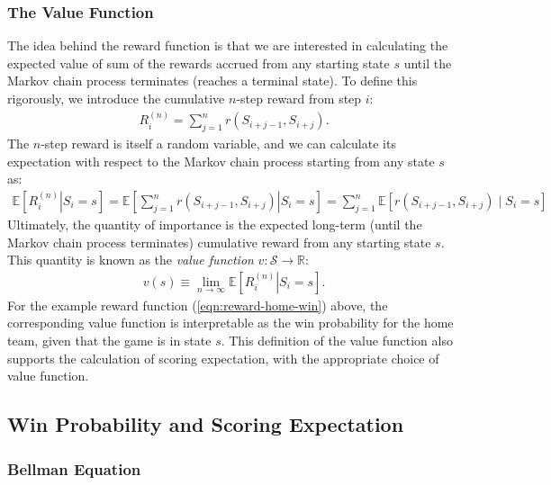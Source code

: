 \documentclass{article}
\begin{document}
    \subsubsection{\sc The Value Function}

      The idea behind the reward function is that we are interested in calculating the expected value of sum of the rewards accrued from any starting state $s$ until the Markov chain process terminates (reaches a terminal state). To define this rigorously, we introduce the cumulative $n$-step reward from step $i$:
      \begin{align*}
        R_i^{(n)} = \sum_{j=1}^n r(S_{i + j - 1}, S_{i + j}).
      \end{align*}
      The $n$-step reward is itself a random variable, and we can calculate its expectation with respect to the Markov chain process starting from any state $s$ as:
      \begin{align*}
        \mathbb{E}\left[\left.R_i^{(n)} \right| S_i = s\right] =       \mathbb{E}\left[\left.\sum_{j=1}^n r(S_{i + j - 1}, S_{i + j}) \right| S_i = s\right] = \sum_{j=1}^n \mathbb{E}[r(S_{i + j - 1}, S_{i + j}) \mid S_i = s]
      \end{align*}
      Ultimately, the quantity of importance is the expected long-term (until the Markov chain process terminates) cumulative reward from any starting state $s$. This quantity is known as the {\it value function} $v : \mathcal S \rightarrow \mathbb{R}$:
      \begin{align}
        \label{eqn:value-function}
        v(s) \equiv \lim_{n\rightarrow\infty}\mathbb{E}\left[\left.R_i^{(n)} \right| S_i = s\right].
      \end{align}
      For the example reward function (\ref{eqn:reward-home-win}) above, the corresponding value function is interpretable as the win probability for the home team, given that the game is in state $s$. This definition of the value function also supports the calculation of scoring expectation, with the appropriate choice of value function.

  \subsection{\sc Win Probability and Scoring Expectation}

    \subsubsection{\sc Bellman Equation}
\end{document}
